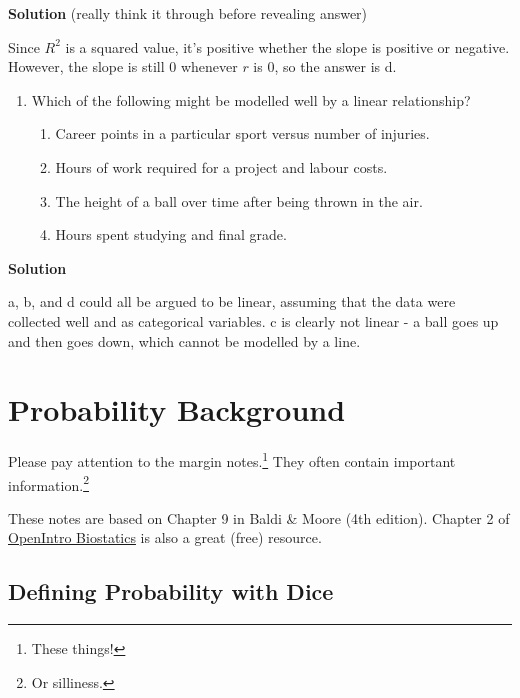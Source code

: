 \documentclass[
  letterpaper,
  DIV=11,
  numbers=noendperiod,
  oneside]{scrreprt}
\providecommand{\tightlist}{%
  \setlength{\itemsep}{0pt}\setlength{\parskip}{0pt}}\usepackage{longtable,booktabs,array}
\begin{document}
\textbf{Solution} (really think it through before revealing answer)

Since \(R^2\) is a squared value, it's positive whether the slope is
positive or negative. However, the slope is still 0 whenever \(r\) is 0,
so the answer is d.

\begin{enumerate}
\def\labelenumi{\arabic{enumi}.}
\setcounter{enumi}{2}
\tightlist
\item
  Which of the following might be modelled well by a linear
  relationship?

  \begin{enumerate}
  \def\labelenumii{\alph{enumii}.}
  \tightlist
  \item
    Career points in a particular sport versus number of injuries.
  \item
    Hours of work required for a project and labour costs.
  \item
    The height of a ball over time after being thrown in the air.
  \item
    Hours spent studying and final grade.
  \end{enumerate}
\end{enumerate}

\textbf{Solution}

a, b, and d could all be argued to be linear, assuming that the data
were collected well and as categorical variables. c is clearly not
linear - a ball goes up and then goes down, which cannot be modelled by
a line.

\hypertarget{probability-background}{%
\chapter{Probability Background}\label{probability-background}}

Please pay attention to the margin notes.\footnote{These things!} They
often contain important information.\footnote{Or silliness.}

These notes are based on Chapter 9 in Baldi \& Moore (4th edition).
Chapter 2 of \href{https://www.openintro.org/book/biostat}{OpenIntro
Biostatics} is also a great (free) resource.

\hypertarget{defining-probability-with-dice}{%
\section{Defining Probability with
Dice}\label{defining-probability-with-dice}}
\end{document}

